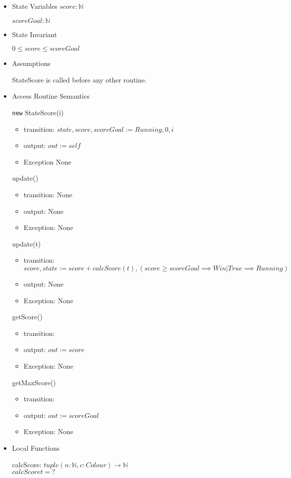 \documentclass[11pt]{article}
\begin{document}
\begin{itemize}
\item State Variables
\label{sec:orgba9eb01}
\(score: \mathbb{N}\)

\(scoreGoal: \mathbb{N}\)

\item State Invariant
\label{sec:org6ad3c59}

\(0 \leq score \leq scoreGoal\)

\item Assumptions
\label{sec:orga8c245a}

StateScore is called before any other routine.

\item Access Routine Semantics
\label{sec:org5aa420a}

\texttt{new} StateScore(i)
\begin{itemize}
\item transition: \(state, score, scoreGoal := Running, 0, i\)
\item output: \(out := self\)
\item Exception None
\end{itemize}

update()
\begin{itemize}
\item transition: None
\item output: None
\item Exception: None
\end{itemize}

update(t)
\begin{itemize}
\item transition: \(score, state := score + calcScore(t), (score \geq scoreGoal \implies Win | True \implies Running)\)
\item output: None
\item Exception: None
\end{itemize}

getScore()
\begin{itemize}
\item transition:
\item output: \(out := score\)
\item Exception: None
\end{itemize}

getMaxScore()
\begin{itemize}
\item transition:
\item output: \(out := scoreGoal\)
\item Exception: None
\end{itemize}

\item Local Functions
\label{sec:org29a916e}

calcScore: \(tuple(n: \mathbb{N}, c: Colour) \rightarrow \mathbb{N}\) \\
\(calcScore t = ?\)
\end{itemize}
\end{document}
